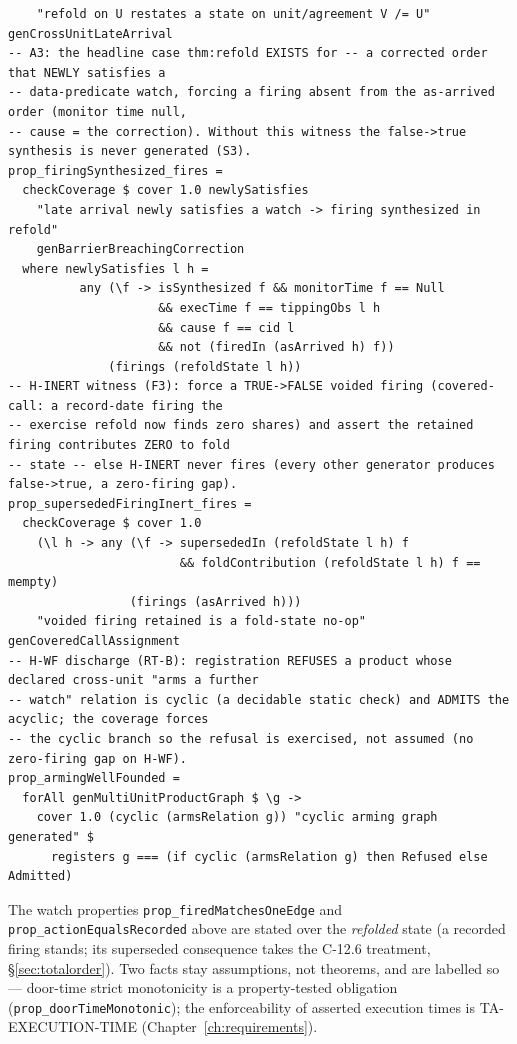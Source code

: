 \documentclass[11pt,a4paper]{article}
\begin{document}
\begin{lstlisting}
    "refold on U restates a state on unit/agreement V /= U" genCrossUnitLateArrival
-- A3: the headline case thm:refold EXISTS for -- a corrected order that NEWLY satisfies a
-- data-predicate watch, forcing a firing absent from the as-arrived order (monitor time null,
-- cause = the correction). Without this witness the false->true synthesis is never generated (S3).
prop_firingSynthesized_fires =
  checkCoverage $ cover 1.0 newlySatisfies
    "late arrival newly satisfies a watch -> firing synthesized in refold"
    genBarrierBreachingCorrection
  where newlySatisfies l h =
          any (\f -> isSynthesized f && monitorTime f == Null
                     && execTime f == tippingObs l h
                     && cause f == cid l
                     && not (firedIn (asArrived h) f))
              (firings (refoldState l h))
-- H-INERT witness (F3): force a TRUE->FALSE voided firing (covered-call: a record-date firing the
-- exercise refold now finds zero shares) and assert the retained firing contributes ZERO to fold
-- state -- else H-INERT never fires (every other generator produces false->true, a zero-firing gap).
prop_supersededFiringInert_fires =
  checkCoverage $ cover 1.0
    (\l h -> any (\f -> supersededIn (refoldState l h) f
                        && foldContribution (refoldState l h) f == mempty)
                 (firings (asArrived h)))
    "voided firing retained is a fold-state no-op" genCoveredCallAssignment
-- H-WF discharge (RT-B): registration REFUSES a product whose declared cross-unit "arms a further
-- watch" relation is cyclic (a decidable static check) and ADMITS the acyclic; the coverage forces
-- the cyclic branch so the refusal is exercised, not assumed (no zero-firing gap on H-WF).
prop_armingWellFounded =
  forAll genMultiUnitProductGraph $ \g ->
    cover 1.0 (cyclic (armsRelation g)) "cyclic arming graph generated" $
      registers g === (if cyclic (armsRelation g) then Refused else Admitted)
\end{lstlisting}

The watch properties \texttt{prop\_firedMatchesOneEdge} and \texttt{prop\_actionEqualsRecorded}
above are stated over the \emph{refolded} state (a recorded firing stands; its superseded
consequence takes the C-12.6 treatment, \S\ref{sec:totalorder}). Two facts stay assumptions, not
theorems, and are labelled so --- door-time strict monotonicity is a property-tested obligation
(\texttt{prop\_doorTimeMonotonic}); the enforceability of asserted execution times is
TA-EXECUTION-TIME (Chapter~\ref{ch:requirements}).
\end{document}
